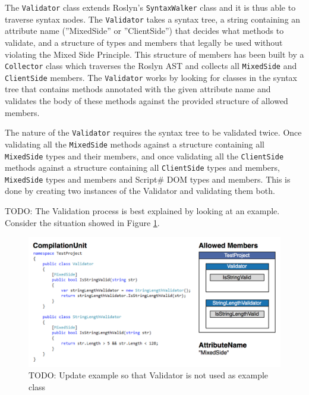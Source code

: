 The \texttt{Validator} class extends Roslyn's \texttt{SyntaxWalker} class and it is thus able to traverse syntax nodes. The \texttt{Validator} takes a syntax tree, a string containing an attribute name (''MixedSide'' or ''ClientSide'') that decides what methods to validate, and a structure of types and members that legally be used without violating the Mixed Side Principle. This structure of members has been built by a \texttt{Collector} class which traverses the Roslyn AST and collects all \texttt{MixedSide} and \texttt{ClientSide} members.
The \texttt{Validator} works by looking for classes in the syntax tree that contains methods annotated with the given attribute name and validates the body of these methods against the provided structure of allowed members.

The nature of the \texttt{Validator} requires the syntax tree to be validated twice. Once validating all the \texttt{MixedSide} methods against a structure containing all \texttt{MixedSide} types and their members, and once validating all the \texttt{ClientSide} methods against a structure containing all \texttt{ClientSide} types and members, \texttt{MixedSide} types and members and Script\# DOM types and members. This is done by creating two instances of the Validator and validating them both.

TODO: The Validation process is best explained by looking at an example. Consider the situation showed in Figure \ref{fig:mixedSideValidationExample}. 

\begin{figure}[H]
	\begin{center}
		\centerline{\includegraphics[width=14cm]{resources/images/MixedSideValidationExample.png}}
	\end{center}
	\caption{TODO: Update example so that Validator is not used as example class}
	\label{fig:mixedSideValidationExample}
\end{figure}		

